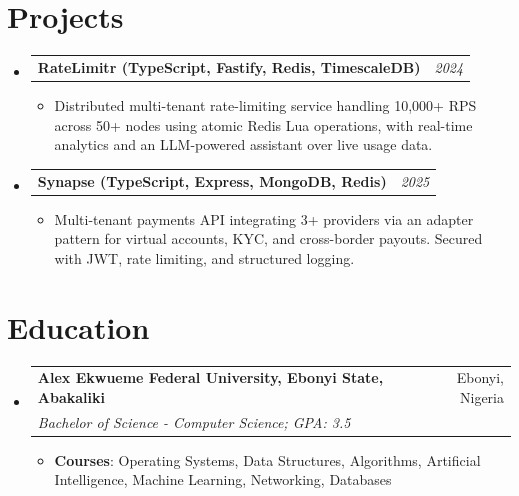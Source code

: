 \documentclass[a4paper]{article}
\makeatletter
\newcommand{\resumeItem}[2]{ \item\small{ \textbf{#1}: #2 } }
\newcommand{\resumeSubheading}[4]{
\vspace{-1pt}
\item[]
\begin{tabular*}{0.97\textwidth}{l@{\extracolsep{\fill}}r}
	\textbf{#1} & #2          \\
	\textit{#3} & \textit{#4} \\
\end{tabular*}
\vspace{1pt}
}
\newcommand{\resumeProjectHeading}[2]{ %
\vspace{2pt}
\item[]
\begin{tabular*}{0.97\textwidth}{l@{\extracolsep{\fill}}r}
	\textbf{#1} & \textit{#2} \\
\end{tabular*}
\vspace{0pt}
}
\newcommand{\resumeSubHeadingListStart}{\begin{itemize}[leftmargin=*,topsep=1pt]}
\newcommand{\resumeSubHeadingListEnd}{\end{itemize}}
\newcommand{\resumeItemListStart}{\begin{itemize}[topsep=0pt,itemsep=0pt,parsep=0pt]}
\newcommand{\resumeItemListEnd}{\end{itemize}}
\makeatother
\begin{document}
	\section{Projects}
	\resumeSubHeadingListStart
	\resumeProjectHeading{RateLimitr (TypeScript, Fastify, Redis, TimescaleDB)}{2024}
	\resumeItemListStart
	\item\small{Distributed multi-tenant rate-limiting service handling 10,000+ RPS across 50+ nodes using atomic Redis Lua operations, with real-time analytics and an LLM-powered assistant over live usage data.}
	\resumeItemListEnd
	\resumeProjectHeading{Synapse (TypeScript, Express, MongoDB, Redis)}{2025}
	\resumeItemListStart
	\item\small{Multi-tenant payments API integrating 3+ providers via an adapter pattern for virtual accounts, KYC, and cross-border payouts. Secured with JWT, rate limiting, and structured logging.}
	\resumeItemListEnd
	\resumeSubHeadingListEnd

	\section{Education}
	\resumeSubHeadingListStart
	\resumeSubheading
	{Alex Ekwueme Federal University, Ebonyi State, Abakaliki}{Ebonyi, Nigeria}
	{Bachelor of Science - Computer Science; GPA: 3.5}{}
	\resumeItemListStart
	\resumeItem{Courses}{Operating Systems, Data Structures, Algorithms, Artificial Intelligence, Machine Learning, Networking, Databases}
	\resumeItemListEnd
	\resumeSubHeadingListEnd
\end{document}
